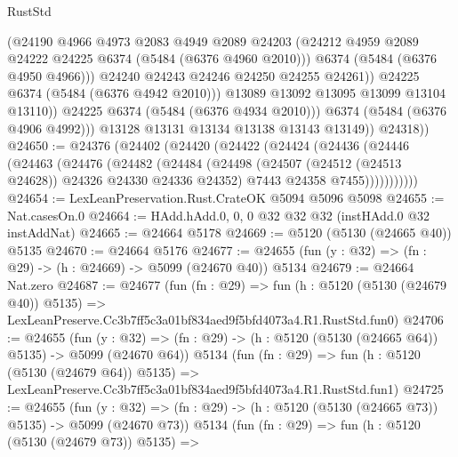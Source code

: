 \begin{lexlean}{RustStd}
\begin{coremodule}
                          (@24190
                            @4966
                            @4973
                            @2083
                            @4949
                            @2089
                            @24203
                            (@24212 @4959 @2089 @24222 @24225 @6374 (@5484 (@6376 @4960 @2010)))
                            @6374
                            (@5484 (@6376 @4950 @4966)))
                          @24240
                          @24243
                          @24246
                          @24250
                          @24255
                          @24261))
                      @24225
                      @6374
                      (@5484 (@6376 @4942 @2010)))
                    @13089
                    @13092
                    @13095
                    @13099
                    @13104
                    @13110))
                @24225
                @6374
                (@5484 (@6376 @4934 @2010)))
              @6374
              (@5484 (@6376 @4906 @4992)))
            @13128
            @13131
            @13134
            @13138
            @13143
            @13149))
        @24318))
@24650 := @24376
    (@24402
      (@24420
        (@24422
          (@24424
            (@24436
              (@24446
                (@24463
                  (@24476
                    (@24482
                      (@24484
                        (@24498
                          (@24507 (@24512 (@24513 @24628)) @24326 @24330 @24336 @24352)
                          @7443
                          @24358
                          @7455)))))))))))
@24654 := LexLeanPreservation.Rust.CrateOK @5094 @5096 @5098
@24655 := Nat.casesOn.{0}
@24664 := HAdd.hAdd.{0, 0, 0} @32 @32 @32 (instHAdd.{0} @32 instAddNat)
@24665 := @24664 @5178
@24669 := @5120 (@5130 (@24665 @40)) @5135
@24670 := @24664 @5176
@24677 := @24655 (fun (y : @32) => (fn : @29) -> (h : @24669) -> @5099 (@24670 @40)) @5134
@24679 := @24664 Nat.zero
@24687 := @24677
    (fun (fn : @29) =>
    fun (h : @5120 (@5130 (@24679 @40)) @5135) =>
    LexLeanPreserve.Cc3b7ff5c3a01bf834aed9f5bfd4073a4.R1.RustStd.fun0)
@24706 := @24655
    (fun (y : @32) => (fn : @29) -> (h : @5120 (@5130 (@24665 @64)) @5135) -> @5099 (@24670 @64))
    @5134
    (fun (fn : @29) =>
    fun (h : @5120 (@5130 (@24679 @64)) @5135) =>
    LexLeanPreserve.Cc3b7ff5c3a01bf834aed9f5bfd4073a4.R1.RustStd.fun1)
@24725 := @24655
    (fun (y : @32) => (fn : @29) -> (h : @5120 (@5130 (@24665 @73)) @5135) -> @5099 (@24670 @73))
    @5134
    (fun (fn : @29) =>
    fun (h : @5120 (@5130 (@24679 @73)) @5135) =>

\end{coremodule}
\end{lexlean}
